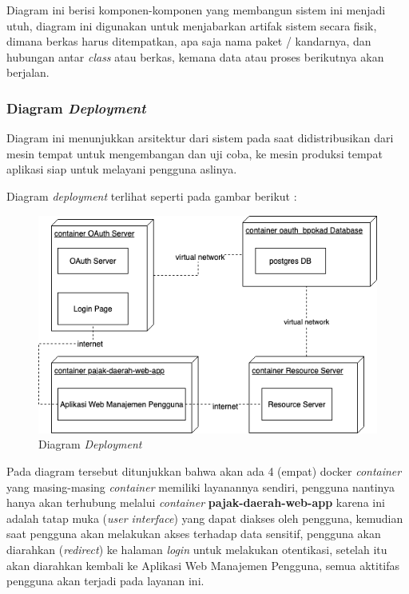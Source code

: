 \documentclass[pdftex,12pt, oneside]{article}
\begin{document}
Diagram ini berisi komponen-komponen yang membangun sistem ini menjadi utuh, diagram ini digunakan untuk menjabarkan artifak sistem secara fisik, dimana berkas harus ditempatkan, apa saja nama paket / kandarnya, dan hubungan antar \textit{class} atau berkas, kemana data atau proses berikutnya akan berjalan.


\subsubsection{Diagram \textit{Deployment}}

Diagram ini menunjukkan arsitektur dari sistem pada saat didistribusikan dari mesin tempat untuk mengembangan dan uji coba, ke mesin produksi tempat aplikasi siap untuk melayani pengguna aslinya.

Diagram \textit{deployment} terlihat seperti pada gambar berikut :

\begin{figure}[H]
	\centering
	\includegraphics[width=1\textwidth]{./resources/deploy-dia}
	\caption{Diagram \textit{Deployment}}
	\label{fig:deploy-dia}
\end{figure}

Pada diagram tersebut ditunjukkan bahwa akan ada 4 (empat) docker \textit{container} yang masing-masing \textit{container} memiliki layanannya sendiri, pengguna nantinya hanya akan terhubung melalui \textit{container} \textbf{pajak-daerah-web-app} karena ini adalah tatap muka (\textit{user interface}) yang dapat diakses oleh pengguna, kemudian saat pengguna akan melakukan akses terhadap data sensitif, pengguna akan diarahkan (\textit{redirect}) ke halaman \textit{login} untuk melakukan otentikasi, setelah itu akan diarahkan kembali ke Aplikasi Web Manajemen Pengguna, semua aktitifas pengguna akan terjadi pada layanan ini.
\end{document}
